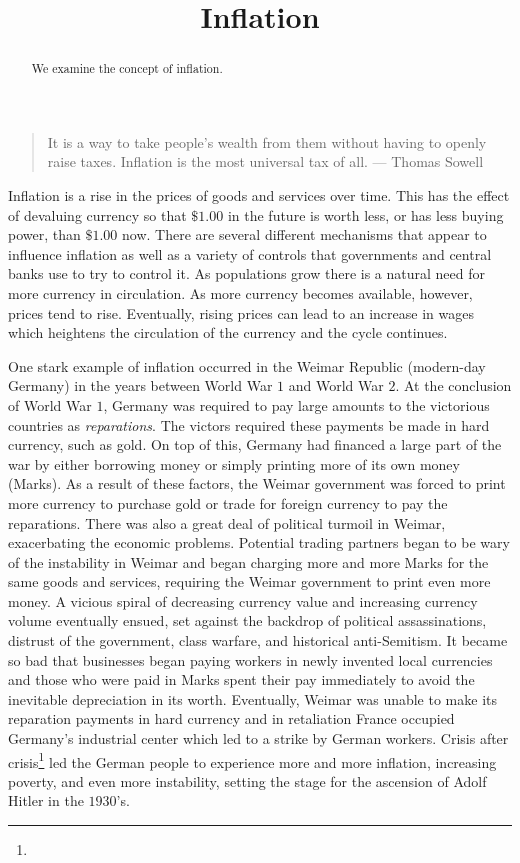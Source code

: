 \documentclass{ximera}
\title{Inflation}
\begin{document}
\begin{abstract}
We examine the concept of inflation.
\end{abstract}
\maketitle

\begin{quote}
It is a way to take people's wealth from them without having to openly raise taxes. Inflation is the most universal tax of all. --- Thomas Sowell
\end{quote}

Inflation is a rise in the prices of goods and services over time. This has the effect of devaluing currency so that $\$1.00$ in the future is worth less, or has less buying power, than $\$1.00$ now. There are several different mechanisms that appear to influence inflation as well as a variety of controls that governments and central banks use to try to control it. As populations grow there is a natural need for more currency in circulation. As more currency becomes available, however, prices tend to rise. Eventually, rising prices can lead to an increase in wages which heightens the circulation of the currency and the cycle continues.

One stark example of inflation occurred in the Weimar Republic (modern-day Germany) in the years between World War $1$ and World War $2$. At the conclusion of World War $1$, Germany was required to pay large amounts to the victorious countries as \emph{reparations}. The victors required these payments be made in hard currency, such as gold. On top of this, Germany had financed a large part of the war by either borrowing money or simply printing more of its own money (Marks). As a result of these factors, the Weimar government was forced to print more currency to purchase gold or trade for foreign currency to pay the reparations. There was also a great deal of political turmoil in Weimar, exacerbating the economic problems. Potential trading partners began to be wary of the instability in Weimar and began charging more and more Marks for the same goods and services, requiring the Weimar government to print even more money. A vicious spiral of decreasing currency value and increasing currency volume eventually ensued, set against the backdrop of political assassinations, distrust of the government, class warfare, and historical anti-Semitism. It became so bad that businesses began paying workers in newly invented local currencies and those who were paid in Marks spent their pay immediately to avoid the inevitable depreciation in its worth. Eventually, Weimar was unable to make its reparation payments in hard currency and in retaliation France occupied Germany's industrial center which led to a strike by German workers. Crisis after crisis\footnote{} led the German people to experience more and more inflation, increasing poverty, and even more instability, setting the stage for the ascension of Adolf Hitler in the $1930$'s.
\end{document}
